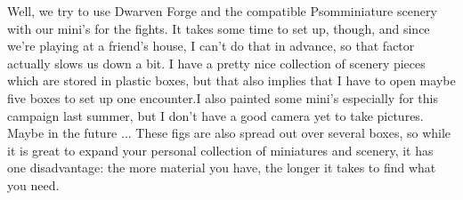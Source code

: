 Well, we try to use Dwarven Forge and the compatible Psomminiature scenery with our mini's for the fights. It takes some time to set up, though, and since we're playing at a friend's house, I can't do that in advance, so that factor actually slows us down a bit. I have a pretty nice collection of scenery pieces which are stored in plastic boxes, but that also implies that I have to open maybe five boxes to set up one encounter.I also painted some mini's especially for this campaign last summer, but I don't have a good camera yet to take pictures. Maybe in the future ... These figs are also spread out over several boxes, so while it is great to expand your personal collection of miniatures and scenery, it has one disadvantage: the more material you have, the longer it takes to find what you need. 
